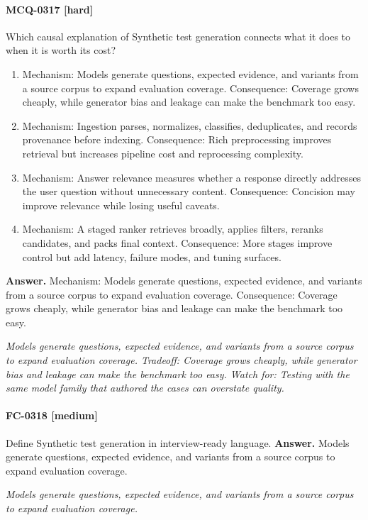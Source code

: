 \paragraph{MCQ-0317 [hard]} Which causal explanation of Synthetic test generation connects what it does to when it is worth its cost?
\begin{enumerate}[label=\Alph*.]
\item Mechanism: Models generate questions, expected evidence, and variants from a source corpus to expand evaluation coverage. Consequence: Coverage grows cheaply, while generator bias and leakage can make the benchmark too easy.
\item Mechanism: Ingestion parses, normalizes, classifies, deduplicates, and records provenance before indexing. Consequence: Rich preprocessing improves retrieval but increases pipeline cost and reprocessing complexity.
\item Mechanism: Answer relevance measures whether a response directly addresses the user question without unnecessary content. Consequence: Concision may improve relevance while losing useful caveats.
\item Mechanism: A staged ranker retrieves broadly, applies filters, reranks candidates, and packs final context. Consequence: More stages improve control but add latency, failure modes, and tuning surfaces.
\end{enumerate}
\noindent\textbf{Answer.} Mechanism: Models generate questions, expected evidence, and variants from a source corpus to expand evaluation coverage. Consequence: Coverage grows cheaply, while generator bias and leakage can make the benchmark too easy.
\par\textit{Models generate questions, expected evidence, and variants from a source corpus to expand evaluation coverage. Tradeoff: Coverage grows cheaply, while generator bias and leakage can make the benchmark too easy. Watch for: Testing with the same model family that authored the cases can overstate quality.}
\paragraph{FC-0318 [medium]} Define Synthetic test generation in interview-ready language.
\noindent\textbf{Answer.} Models generate questions, expected evidence, and variants from a source corpus to expand evaluation coverage.
\par\textit{Models generate questions, expected evidence, and variants from a source corpus to expand evaluation coverage.}
